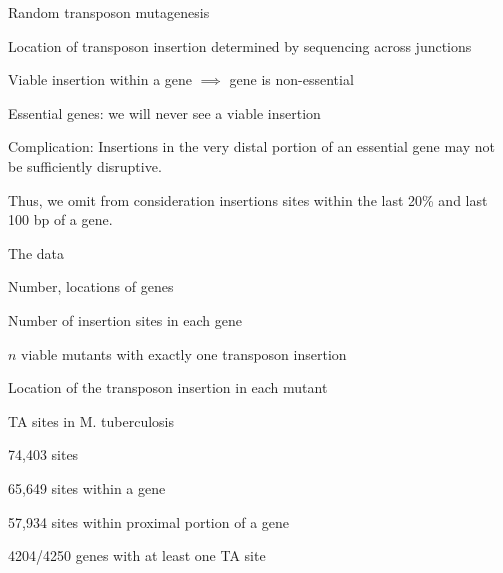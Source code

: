 \documentclass[aspectratio=169,12pt,t]{beamer}
\begin{document}
\begin{frame}{Random transposon mutagenesis}

  \bbi
  \item Location of transposon insertion determined by sequencing across
junctions

\item Viable insertion within a gene $\implies$ gene is non-essential

\item Essential genes: we will never see a viable insertion

\item {\hilit Complication}: Insertions in the very distal portion of
  an essential gene may not be sufficiently disruptive.

Thus, we omit from consideration insertions sites within the last 20\%
and last 100 bp of a gene.
\ei

\note{
}
\end{frame}






\begin{frame}{The data}

  \bbi
\item Number, locations of genes
\item Number of insertion sites in each gene
\item {\hilit $n$} viable mutants with exactly one transposon
    insertion
\item Location of the transposon insertion in each mutant
\ei

\note{
}
\end{frame}



\begin{frame}{TA sites in M. tuberculosis}


  \bbi
\item 74,403 sites
\item 65,649 sites within a gene
\item 57,934 sites within proximal portion of a gene
\item 4204/4250 genes with at least one TA site
  \ei

\note{
}
\end{frame}
\end{document}
